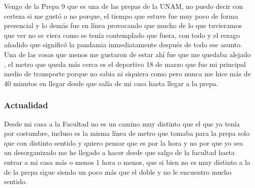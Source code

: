 \documentclass[letterpaper, 12pt]{article}
\begin{document}
        Vengo de la Prepa 9 que es una de las prepas de la UNAM, no puedo decir con certeza si me gustó o no porque, el tiempo que estuve fue muy poco %
        de forma presencial y lo demás fue en línea %
        provocando que mucho de lo que tuvieramos que ver no se viera como se tenía contemplado que fuera, con todo y el rezago añadido que significó la pandamia inmediatamente después de todo ese asunto. Una de las cosas que menos me gustaron de estar ahí fue que me quedaba alejado%
        , el metro que queda más cerca es el deportivo 18 de marzo %
        que fue mi principal medio de transporte porque no sabia ni siquiera como pero nunca me hice más de 40 minutos en llegar desde que salía de mi casa hasta llegar a la prepa.%
        
        \subsubsection*{Actualidad}
        Desde mi casa a la Facultad %
        no es un camino muy distinto que el que ya tenía por costumbre, incluso es la misma línea de metro que tomaba para la prepa solo que con distinto sentido y quiero pensar que es por la hora y no por que yo sea un desorganizado %
        me he llegado a hacer desde que salgo de la facultad hasta entrar a mi casa más o menos 1 hora o menos, que si bien no es muy distinto a la de la prepa sigue siendo un poco más que el doble y no le encuentro mucho sentido.%
        
\end{document}

